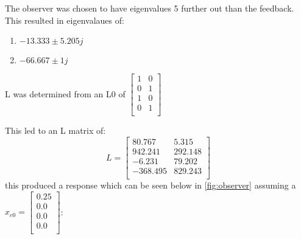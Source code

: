 The observer was chosen to have eigenvalues 5 further out than the feedback. This resulted in eigenvalaues of:\begin{enumerate}
\item$-13.333 \pm 5.205j$\\
\item$-66.667 \pm 1j$\end{enumerate}
L was determined from an L0 of $\begin{bmatrix}
1&0\\
0&1\\
1&0\\
0&1\\
\end{bmatrix}
$

This led to an L matrix of: \begin{equation}L = \begin{bmatrix}
80.767&5.315\\
942.241&292.148\\
-6.231&79.202\\
-368.495&829.243\\
\end{bmatrix}
\end{equation}this produced a response which can be seen below in \autoref{fig:observer}
assuming a $x_{e0} = \begin{bmatrix}
0.25\\
0.0\\
0.0\\
0.0\\
\end{bmatrix}
$:
